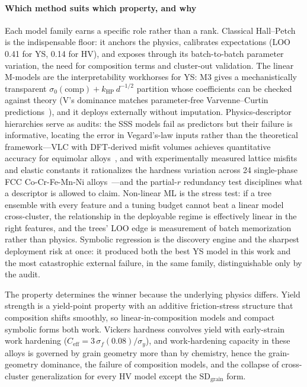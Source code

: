 \documentclass[5p,times,twocolumn]{elsarticle}
\begin{document}
\paragraph{Which method suits which property, and why}
\label{sec:family_reading}

Each model family earns a specific role rather than a rank.  Classical Hall--Petch is the indispensable floor: it anchors the physics, calibrates expectations (LOO 0.41 for YS, 0.14 for HV), and exposes through its batch-to-batch parameter variation, the need for composition terms and cluster-out validation. The linear M-models are the interpretability workhorses for YS: M3 gives a mechanistically transparent $\sigma_0(\text{comp}) + k_\text{HP}\,d^{-1/2}$ partition whose coefficients can be checked against theory (V's dominance matches parameter-free Varvenne--Curtin predictions~\cite{Yin2020}), and it deploys externally without imputation. Physics-descriptor hierarchies serve as audits: the SSS models fail as predictors but their failure is informative, locating the error in Vegard's-law inputs rather than the theoretical framework---VLC with DFT-derived misfit volumes achieves quantitative accuracy for equimolar alloys~\cite{Varvenne2016,Moitzi2022}, and with experimentally measured lattice misfits and elastic constants it rationalizes the hardness variation across 24 single-phase FCC Co-Cr-Fe-Mn-Ni alloys~\cite{Bracq2019}---and the partial-$r$ redundancy test disciplines what a descriptor is allowed to claim. Non-linear ML is the stress test: if a tree ensemble with every feature and a tuning budget cannot beat a linear model cross-cluster, the relationship in the deployable regime is effectively linear in the right features, and the trees' LOO edge is measurement of batch memorization rather than physics. Symbolic regression is the discovery engine and the sharpest deployment risk at once: it produced both the best YS model in this work and the most catastrophic external failure, in the same family, distinguishable only by the audit.

The property determines the winner because the underlying physics differs. Yield strength is a yield-point property with an additive friction-stress structure that composition shifts smoothly, so linear-in-composition models and compact symbolic forms both work. Vickers hardness convolves yield with early-strain work hardening ($C_\text{eff} = 3\,\sigma_f(0.08)/\sigma_y$), and work-hardening capacity in these alloys is governed by grain geometry more than by chemistry, hence the grain-geometry dominance, the failure of composition models, and the collapse of cross-cluster generalization for every HV model except the $\text{SD}_\text{grain}$ form.
\end{document}
